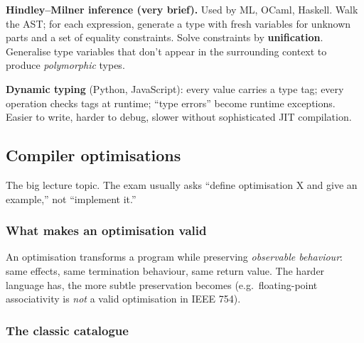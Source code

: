 \documentclass[11pt,a4paper]{article}
\begin{document}
\textbf{Hindley--Milner inference (very brief).} Used by ML, OCaml, Haskell. Walk the AST; for each expression, generate a type with fresh variables for unknown parts and a set of equality constraints. Solve constraints by \textbf{unification}. Generalise type variables that don't appear in the surrounding context to produce \emph{polymorphic} types.

\textbf{Dynamic typing} (Python, JavaScript): every value carries a type tag; every operation checks tags at runtime; ``type errors'' become runtime exceptions. Easier to write, harder to debug, slower without sophisticated JIT compilation.

\subsection{Compiler optimisations}

\begin{useful}
The big lecture topic. The exam usually asks ``define optimisation X and give an example,'' not ``implement it.''
\end{useful}

\subsubsection*{What makes an optimisation valid}

An optimisation transforms a program while preserving \emph{observable behaviour}: same effects, same termination behaviour, same return value. The harder language has, the more subtle preservation becomes (e.g.\ floating-point associativity is \emph{not} a valid optimisation in IEEE 754).

\subsubsection*{The classic catalogue}
\end{document}
